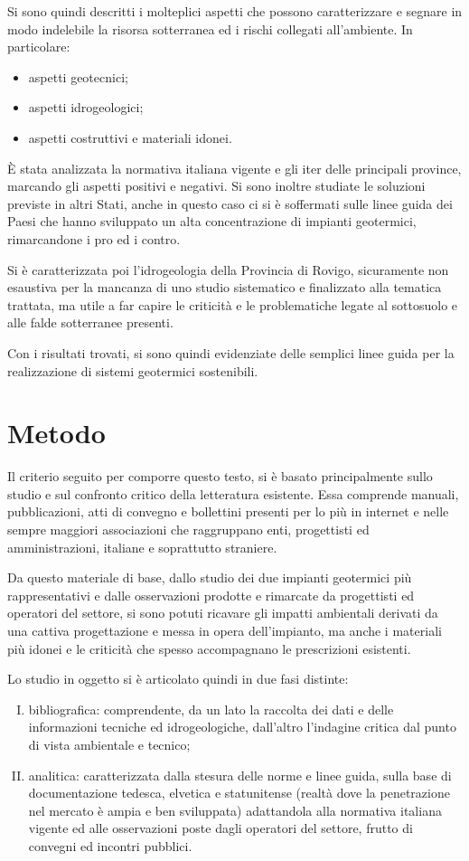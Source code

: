 Si sono quindi descritti i molteplici aspetti che possono caratterizzare e segnare in modo indelebile la risorsa sotterranea ed i rischi collegati all'ambiente. 
In particolare:
\begin{itemize}
\item aspetti geotecnici;
\item aspetti idrogeologici;
\item aspetti costruttivi e materiali idonei.
\end{itemize}

È stata analizzata la normativa italiana vigente e gli iter delle principali province, marcando gli aspetti positivi e negativi. Si sono inoltre studiate le soluzioni previste in altri Stati, anche in questo caso ci si è soffermati sulle linee guida dei Paesi che hanno sviluppato un alta concentrazione di impianti geotermici, rimarcandone i pro ed i contro.

Si è caratterizzata poi l'idrogeologia della Provincia di Rovigo, sicuramente non esaustiva per la mancanza di uno studio sistematico e finalizzato alla tematica trattata, ma utile a far capire le criticità e le problematiche legate al sottosuolo e alle falde sotterranee presenti.

Con i risultati trovati, si sono quindi evidenziate delle semplici linee guida per la realizzazione di sistemi geotermici sostenibili.

\section*{Metodo}
Il criterio seguito per comporre questo testo, si è basato principalmente sullo studio e sul confronto critico della letteratura esistente. Essa comprende manuali, pubblicazioni, atti di convegno e bollettini presenti per lo più in internet e nelle sempre maggiori associazioni che raggruppano enti, progettisti ed amministrazioni, italiane e soprattutto straniere.

Da questo materiale di base, dallo studio dei due impianti geotermici più rappresentativi e dalle osservazioni prodotte e rimarcate da progettisti ed operatori del settore, si sono potuti ricavare gli impatti ambientali derivati da una cattiva progettazione e messa in opera dell'impianto, ma anche i materiali più idonei e le criticità che spesso accompagnano le prescrizioni esistenti.

Lo studio in oggetto si è articolato quindi in due fasi distinte:
\begin{enumerate}[I.]
\item bibliografica: comprendente, da un lato la raccolta dei dati e delle informazioni tecniche ed idrogeologiche, dall'altro l'indagine critica dal punto di vista ambientale e tecnico;
\item analitica: caratterizzata dalla stesura delle norme e linee guida, sulla base di documentazione tedesca, elvetica e statunitense (realtà dove la penetrazione nel mercato è ampia e ben sviluppata) adattandola alla normativa italiana vigente ed alle osservazioni poste dagli operatori del settore, frutto di convegni ed incontri pubblici.
\end{enumerate}
